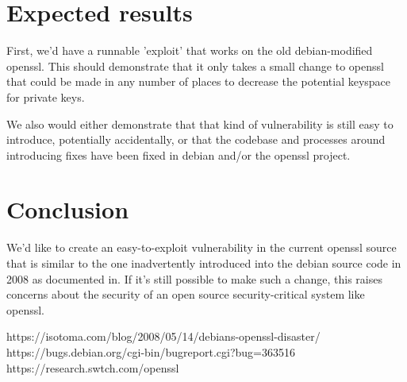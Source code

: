 \documentclass[conference]{IEEEtran}
\begin{document}
\section{Expected results}

First, we'd have a runnable 'exploit' that works on the old
debian-modified openssl. This should demonstrate that it only takes a
small change to openssl that could be made in any number of places to
decrease the potential keyspace for private keys.

We also would either demonstrate that that kind of vulnerability is
still easy to introduce, potentially accidentally, or that the
codebase and processes around introducing fixes have been fixed in
debian and/or the openssl project.

\section{Conclusion}
We'd like to create an easy-to-exploit vulnerability in the current
openssl source that is similar to the one inadvertently introduced
into the debian source code in 2008 as documented in\cite{1}. If it's still possible to
make such a change, this raises concerns about the security of an open
source security-critical system like openssl.

\begin{thebibliography}{00}

 https://isotoma.com/blog/2008/05/14/debians-openssl-disaster/
 https://bugs.debian.org/cgi-bin/bugreport.cgi?bug=363516
 https://research.swtch.com/openssl  
\end{thebibliography}
\end{document}
